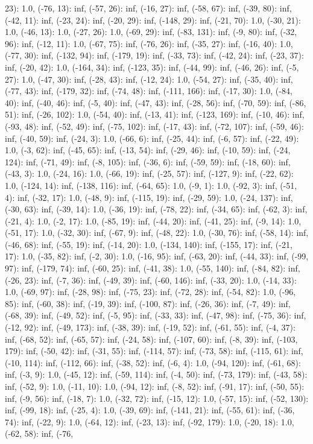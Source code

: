 \documentclass[parskip=half]{scrartcl}
\begin{document}
23): 1.0, (-76, 13): inf, (-57, 26): inf, (-16, 27): inf, (-58, 67): inf, (-39, 80): inf, (-42, 11): inf, (-23, 24): inf, (-20, 29): inf, (-148, 29): inf, (-21, 70): 1.0, (-30, 21): 1.0, (-46, 13): 1.0, (-27, 26): 1.0, (-69, 29): inf, (-83, 131): inf, (-9, 80): inf, (-32, 96): inf, (-12, 11): 1.0, (-67, 75): inf, (-76, 26): inf, (-35, 27): inf, (-16, 40): 1.0, (-77, 30): inf, (-132, 94): inf, (-179, 19): inf, (-33, 73): inf, (-42, 24): inf, (-23, 37): inf, (-20, 42): 1.0, (-164, 34): inf, (-123, 35): inf, (-44, 99): inf, (-46, 26): inf, (-5, 27): 1.0, (-47, 30): inf, (-28, 43): inf, (-12, 24): 1.0, (-54, 27): inf, (-35, 40): inf, (-77, 43): inf, (-179, 32): inf, (-74, 48): inf, (-111, 166): inf, (-17, 30): 1.0, (-84, 40): inf, (-40, 46): inf, (-5, 40): inf, (-47, 43): inf, (-28, 56): inf, (-70, 59): inf, (-86, 51): inf, (-26, 102): 1.0, (-54, 40): inf, (-13, 41): inf, (-123, 169): inf, (-10, 46): inf, (-93, 48): inf, (-52, 49): inf, (-75, 102): inf, (-17, 43): inf, (-72, 107): inf, (-59, 46): inf, (-40, 59): inf, (-24, 3): 1.0, (-66, 6): inf, (-25, 44): inf, (-6, 57): inf, (-22, 49): 1.0, (-3, 62): inf, (-45, 65): inf, (-13, 54): inf, (-29, 46): inf, (-10, 59): inf, (-24, 124): inf, (-71, 49): inf, (-8, 105): inf, (-36, 6): inf, (-59, 59): inf, (-18, 60): inf, (-43, 3): 1.0, (-24, 16): 1.0, (-66, 19): inf, (-25, 57): inf, (-127, 9): inf, (-22, 62): 1.0, (-124, 14): inf, (-138, 116): inf, (-64, 65): 1.0, (-9, 1): 1.0, (-92, 3): inf, (-51, 4): inf, (-32, 17): 1.0, (-48, 9): inf, (-115, 19): inf, (-29, 59): 1.0, (-24, 137): inf, (-30, 63): inf, (-39, 14): 1.0, (-36, 19): inf, (-78, 22): inf, (-34, 65): inf, (-62, 3): inf, (-21, 4): 1.0, (-2, 17): 1.0, (-85, 19): inf, (-44, 20): inf, (-41, 25): inf, (-9, 14): 1.0, (-51, 17): 1.0, (-32, 30): inf, (-67, 9): inf, (-48, 22): 1.0, (-30, 76): inf, (-58, 14): inf, (-46, 68): inf, (-55, 19): inf, (-14, 20): 1.0, (-134, 140): inf, (-155, 17): inf, (-21, 17): 1.0, (-35, 82): inf, (-2, 30): 1.0, (-16, 95): inf, (-63, 20): inf, (-44, 33): inf, (-99, 97): inf, (-179, 74): inf, (-60, 25): inf, (-41, 38): 1.0, (-55, 140): inf, (-84, 82): inf, (-26, 23): inf, (-7, 36): inf, (-49, 39): inf, (-60, 146): inf, (-33, 20): 1.0, (-14, 33): 1.0, (-69, 97): inf, (-28, 98): inf, (-75, 23): inf, (-72, 28): inf, (-54, 82): 1.0, (-96, 85): inf, (-60, 38): inf, (-19, 39): inf, (-100, 87): inf, (-26, 36): inf, (-7, 49): inf, (-68, 39): inf, (-49, 52): inf, (-5, 95): inf, (-33, 33): inf, (-47, 98): inf, (-75, 36): inf, (-12, 92): inf, (-49, 173): inf, (-38, 39): inf, (-19, 52): inf, (-61, 55): inf, (-4, 37): inf, (-68, 52): inf, (-65, 57): inf, (-24, 58): inf, (-107, 60): inf, (-8, 39): inf, (-103, 179): inf, (-50, 42): inf, (-31, 55): inf, (-114, 57): inf, (-73, 58): inf, (-115, 61): inf, (-10, 114): inf, (-112, 66): inf, (-38, 52): inf, (-6, 4): 1.0, (-94, 120): inf, (-61, 68): inf, (-3, 9): 1.0, (-45, 12): inf, (-59, 114): inf, (-4, 50): inf, (-73, 179): inf, (-43, 58): inf, (-52, 9): 1.0, (-11, 10): 1.0, (-94, 12): inf, (-8, 52): inf, (-91, 17): inf, (-50, 55): inf, (-9, 56): inf, (-18, 7): 1.0, (-32, 72): inf, (-15, 12): 1.0, (-57, 15): inf, (-52, 130): inf, (-99, 18): inf, (-25, 4): 1.0, (-39, 69): inf, (-141, 21): inf, (-55, 61): inf, (-36, 74): inf, (-22, 9): 1.0, (-64, 12): inf, (-23, 13): inf, (-92, 179): 1.0, (-20, 18): 1.0, (-62, 58): inf, (-76, 
\end{document}
